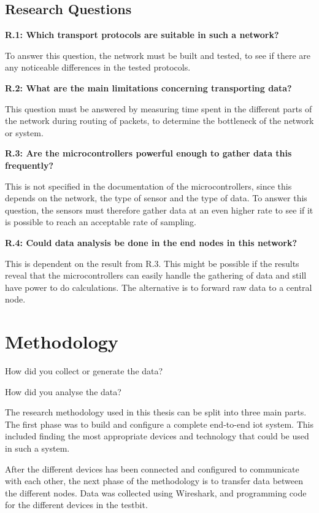 \subsection{Research Questions}

\noindent \textbf{R.1: Which transport protocols are suitable in such a network?}

\noindent To answer this question, the network must be built and tested, to see if there are any noticeable differences in the tested protocols.

\noindent\textbf{R.2: What are the main limitations concerning transporting data?}

\noindent This question must be answered by measuring time spent in the different parts of the network during routing of packets, to determine the bottleneck of the network or system. 

\noindent\textbf{R.3: Are the \glspl{microcontroller} powerful enough to gather data this frequently?}

\noindent This is not specified in the documentation of the \glspl{microcontroller}, since this depends on the network, the type of sensor and the type of data. To answer this question, the sensors must therefore gather data at an even higher rate to see if it is possible to reach an acceptable rate of sampling. 

\noindent\textbf{R.4: Could data analysis be done in the end nodes in this network?}

\noindent This is dependent on the result from R.3. This might be possible if the results reveal that the \glspl{microcontroller} can easily handle the gathering of data and still have power to do calculations. The alternative is to forward raw data to a central node. 

\section{Methodology}

How did you collect or generate the data?

How did you analyse the data? 

The research methodology used in this thesis can be split into three main parts. The first phase was to build and configure a complete end-to-end \gls{iot} system. This included finding the most appropriate devices and technology that could be used in such a system. 

After the different devices has been connected and configured to communicate with each other, the next phase of the methodology is to transfer data between the different nodes. Data was collected using Wireshark, and programming code for the different devices in the testbit. 

